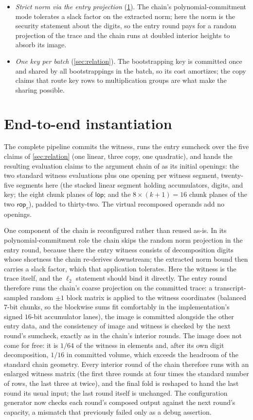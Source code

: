 \documentclass[11pt]{article}
\newcommand{\lop}{\mathsf{lop}}
\newcommand{\rop}{\mathsf{rop}}
\begin{document}
\begin{itemize}
  \item \emph{Strict norm via the entry projection} (\cref{sec:results}). The chain's polynomial-commitment mode tolerates a slack factor on the extracted norm; here the norm is the security statement about the digits, so the entry round pays for a random projection of the trace and the chain runs at doubled interior heights to absorb its image.
  \item \emph{One key per batch} (\cref{sec:relation}). The bootstrapping key is committed once and shared by all bootstrappings in the batch, so its cost amortizes; the copy claims that route key rows to multiplication groups are what make the sharing possible.
\end{itemize}

\section{End-to-end instantiation}\label{sec:results}

The complete pipeline commits the witness, runs the entry sumcheck over the five claims of \cref{sec:relation} (one linear, three copy, one quadratic), and hands the resulting evaluation claims to the argument chain of \cite{rokoko} as its initial openings: the two standard witness evaluations plus one opening per witness segment, twenty-five segments here (the stacked linear segment holding accumulators, digits, and key; the eight chunk planes of $\lop$; and the $8 \times (k+1) = 16$ chunk planes of the two $\rop_v$), padded to thirty-two. The virtual recomposed operands add no openings.

One component of the chain is reconfigured rather than reused as-is. In its polynomial-commitment role the chain skips the random norm projection in the entry round, because there the entry witness consists of decomposition digits whose shortness the chain re-derives downstream; the extracted norm bound then carries a slack factor, which that application tolerates. Here the witness is the trace itself, and the $\ell_2$ statement should bind it directly. The entry round therefore runs the chain's coarse projection on the committed trace: a transcript-sampled random $\pm 1$ block matrix is applied to the witness coordinates (balanced $7$-bit chunks, so the blockwise sums fit comfortably in the implementation's signed $16$-bit accumulator lanes), the image is committed alongside the other entry data, and the consistency of image and witness is checked by the next round's sumcheck, exactly as in the chain's interior rounds. The image does not come for free: it is $1/64$ of the witness in elements and, after its own digit decomposition, $1/16$ in committed volume, which exceeds the headroom of the standard chain geometry. Every interior round of the chain therefore runs with an enlarged witness matrix (the first three rounds at four times the standard number of rows, the last three at twice), and the final fold is reshaped to hand the last round its usual input; the last round itself is unchanged. The configuration generator now checks each round's composed output against the next round's capacity, a mismatch that previously failed only as a debug assertion.
\end{document}
